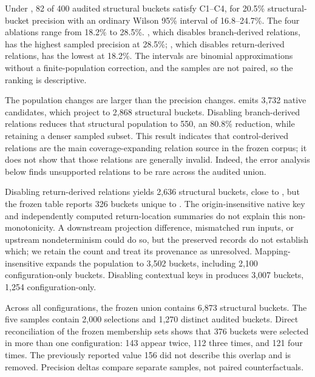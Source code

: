 

Under , 82 of 400 audited structural buckets satisfy C1--C4, for 20.5\% structural-bucket precision with an ordinary Wilson 95\% interval of 16.8--24.7\%. The four ablations range from 18.2\% to 28.5\%. , which disables branch-derived relations, has the highest sampled precision at 28.5\%; , which disables return-derived relations, has the lowest at 18.2\%. The intervals are binomial approximations without a finite-population correction, and the samples are not paired, so the ranking is descriptive.



The population changes are larger than the precision changes.  emits 3,732 native candidates, which project to 2,868 structural buckets. Disabling branch-derived relations reduces that structural population to 550, an 80.8\% reduction, while retaining a denser sampled subset. This result indicates that control-derived relations are the main coverage-expanding relation source in the frozen corpus; it does not show that those relations are generally invalid. Indeed, the error analysis below finds unsupported relations to be rare across the audited union.

Disabling return-derived relations yields 2,636 structural buckets, close to , but the frozen table reports 326 buckets unique to . The origin-insensitive native key and independently computed return-location summaries do not explain this non-monotonicity. A downstream projection difference, mismatched run inputs, or upstream nondeterminism could do so, but the preserved records do not establish which; we retain the count and treat its provenance as unresolved. Mapping-insensitive  expands the population to 3,502 buckets, including 2,100 configuration-only buckets. Disabling contextual keys in  produces 3,007 buckets, 1,254 configuration-only.

Across all configurations, the frozen union contains 6,873 structural buckets. The five samples contain 2,000 selections and 1,270 distinct audited buckets. Direct reconciliation of the frozen membership sets shows that 376 buckets were selected in more than one configuration: 143 appear twice, 112 three times, and 121 four times. The previously reported value 156 did not describe this overlap and is removed. Precision deltas compare separate samples, not paired counterfactuals.

